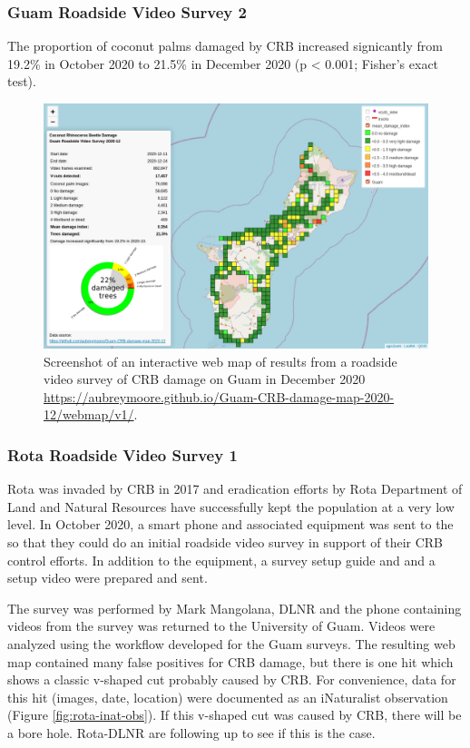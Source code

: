 \documentclass[12pt,letterpaper,english,bibliography=totocnumbered, abstract=on]{scrartcl}
\begin{document}
\clearpage
\subsubsection{Guam Roadside Video Survey 2}

The proportion of coconut palms damaged by CRB increased signicantly from 19.2\% in
October 2020 to 21.5\% in December 2020 (p < 0.001; Fisher's exact test).

\begin{figure}[h]
	\centering
	\includegraphics[width=1\linewidth]{images/crb-webmap-2020-12.png}
	\caption{Screenshot of an interactive web map of results from a roadside video survey of
		CRB damage on Guam in December 2020 \url{https://aubreymoore.github.io/Guam-CRB-damage-map-2020-12/webmap/v1/}.}
	\label{fig:guam02}
\end{figure}


\clearpage
\subsubsection{Rota Roadside Video Survey 1}

Rota was invaded by CRB in 2017 and eradication efforts by Rota Department of Land and Natural Resources have successfully kept the population at a very low level. In October 2020, a smart phone and associated equipment was sent to the so that they could do an initial roadside video survey in support of their CRB control efforts. In addition to the equipment, a survey setup guide and  \cite{aubreymooreSetAutomatedRoadside2020} and a setup video \cite{mooreYouTubeVideoMounting2020} were prepared and sent.
 
The survey was performed by Mark Mangolana, DLNR and the phone containing videos from the survey was returned to the University of Guam.  Videos were analyzed using the workflow developed for the Guam surveys. The resulting web map contained many false positives for CRB damage, but there is one hit which shows a classic v-shaped cut probably caused by CRB. For convenience, data for this hit (images, date, location) were documented as an iNaturalist observation (Figure \ref{fig:rota-inat-obs}). If this v-shaped cut was caused by CRB, there will be a bore hole. Rota-DLNR are following up to see if this is the case.
\end{document}
